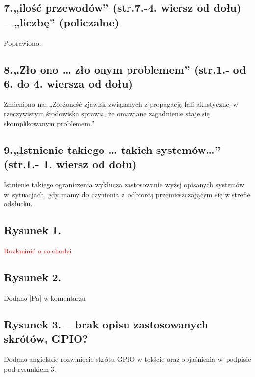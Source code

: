 \documentclass[12pt]{article}
\begin{document}
\subsection{7.„ilość przewodów” (str.7.-4. wiersz od dołu) – „liczbę” (policzalne)}
Poprawiono.

\subsection{8.„Zło ono … zło onym problemem” (str.1.- od 6. do 4. wiersza od dołu)}
Zmieniono na: ,,Złożoność
zjawisk związanych z propagacją fali akustycznej w rzeczywistym środowisku
sprawia, że omawiane zagadnienie staje się skomplikowanym problemem.''

\subsection{9.„Istnienie takiego … takich systemów…” (str.1.- 1. wiersz od dołu)}
Istnienie takiego ograniczenia wyklucza zastosowanie wyżej opisanych systemów w~sytuacjach, gdy mamy do czynienia z~odbiorcą przemieszczającym się w strefie
odsłuchu.

\subsection{Rysunek 1.}

\textcolor{red}{Rozkminić o co chodzi}

\subsection{Rysunek 2.} 
Dodano [Pa] w komentarzu

\subsection{Rysunek 3. – brak opisu zastosowanych skrótów, GPIO?}

Dodano angielskie rozwinięcie skrótu GPIO w tekście oraz  objaśnienia w~podpisie pod rysunkiem 3.


    
\end{document}
